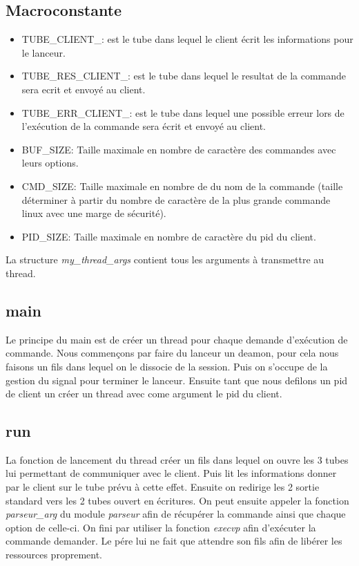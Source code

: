 \documentclass[12pt]{article}
\begin{document}
\subsection{Macroconstante}
\begin{itemize}
      \item TUBE\_CLIENT\_: est le tube dans lequel le client écrit les
            informations
            pour le lanceur.
      \item TUBE\_RES\_CLIENT\_: est le tube dans lequel le resultat de la
            commande
            sera ecrit et envoyé au client.
      \item TUBE\_ERR\_CLIENT\_: est le tube dans lequel une possible erreur
            lors
            de l'exécution de la commande sera écrit et envoyé au client.
      \item BUF\_SIZE: Taille maximale en nombre de caractère des commandes
            avec
            leurs options.
      \item CMD\_SIZE: Taille maximale en nombre de  du nom de la commande
            (taille déterminer à partir du nombre de caractère de la plus
            grande
            commande
            linux avec une marge de sécurité).
      \item PID\_SIZE: Taille maximale en nombre de caractère du pid du client.
\end{itemize}
La structure \textit{my\_thread\_args} contient tous les arguments à
transmettre au thread.
\subsection{main}
Le principe du main est de créer un thread pour chaque demande d'exécution de
commande.
Nous commençons par faire du lanceur un deamon, pour cela nous faisons un fils
dans lequel on le dissocie de la session. Puis on s'occupe de la gestion
du signal pour terminer le lanceur. Ensuite tant que nous defilons un pid de
client un créer un thread avec come argument le pid du client.
\subsection{run}
La fonction de lancement du thread créer un fils dans lequel on ouvre les 3
tubes lui permettant de communiquer
avec le client. Puis lit les informations donner par le client sur le tube
prévu à cette effet. Ensuite on redirige les 2 sortie standard vers les 2 tubes
ouvert en écritures. On peut ensuite appeler la fonction \textit{parseur\_arg}
du module \textit{parseur} afin de récupérer la commande ainsi que chaque
option de celle-ci. On fini par utiliser la fonction \textit{execvp} afin
d'exécuter la commande demander. Le pére lui ne fait que attendre son fils afin
de libérer les ressources proprement.
\end{document}
